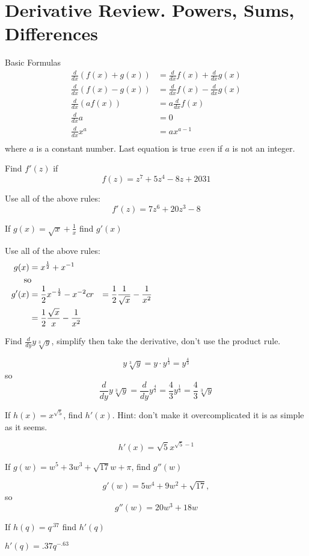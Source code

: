 \section*{Derivative Review. Powers, Sums, Differences}
\noprintanswers
Basic Formulas
\begin{equation}
  \begin{aligned}
    \frac{d}{dx} \left(f(x)+g(x)\right) &= \frac{d}{dx} f(x)+\frac{d}{dx} g(x) \\
    \frac{d}{dx} \left(f(x)-g(x)\right) &= \frac{d}{dx} f(x)-\frac{d}{dx} g(x) \\
    \frac{d}{dx} \left(af(x)\right) &= a\frac{d}{dx} f(x) \\
    \frac{d}{dx} a &= 0 \\
    \frac{d}{dx} x^a &= ax^{a-1} \\
  \end{aligned}
\end{equation}
where $a$ is a constant number. Last equation is true {\it even} if $a$ is not an integer.
  
\begin{questions}
\question
Find $f'(z)$ if
$$f(z)=z^7+5z^4-8z+2031$$
\begin{solution}[1.5in]
  Use all of the above rules:
  $$f'(z)=7z^6+20z^3-8$$
\end{solution}
\question
If $\displaystyle{g(x) = \sqrt{x}+\frac{1}{x}}$ find $g'(x)$
\begin{solution}[1.5in]
  Use all of the above rules:
  \begin{equation}
    \begin{aligned}
    g(x) &= x^{\frac{1}{2}}+ x^{-1}\cr
    \noalign{so}
    g'(x)&= \frac{1}{2}x^{-\frac{1}{2}} - x^{-2}cr
    &= \frac{1}{2}\frac{1}{\sqrt{x}} - \frac{1}{x^2}\cr
    &= \frac{1}{2}\frac{\sqrt{x}}{x} - \frac{1}{x^2}\cr
    \end{aligned}
  \end{equation}
\end{solution}
\question
Find $\displaystyle{\frac{d}{dy} y\sqrt[3]{y}}$, simplify then take the derivative, don't use the product rule.
\begin{solution}[1.5in]
  $$y\sqrt[3]{y}=y\cdot y^{\frac{1}{3}}=y^{\frac{4}{3}}$$
    so
    $$\frac{d}{dy} y\sqrt[3]{y} = \frac{d}{dy} y^{\frac{4}{3}} = \frac{4}{3}y^{\frac{1}{3}} = \frac{4}{3}\sqrt[3]{y}$$
\end{solution}
\newpage
\question
If $h(x)=x^{\sqrt{5}}$, find $h'(x)$. Hint: don't make it overcomplicated it is as simple as it seems.
\begin{solution}[1.5in]
  $$h'(x)=\sqrt{5}x^{\sqrt{5}-1}$$
\end{solution}
\question
If $g(w) = w^5+3w^3+\sqrt{17}w+\pi$, find $g''(w)$
\begin{solution}[1.5in]
  $$g'(w)=5w^4+9w^2+\sqrt{17},$$ so
  $$g''(w)=20w^3+18w$$
\end{solution}
\question
If $h(q) = q^{.37}$ find $h'(q)$
\begin{solution}[1.5in]
  $h'(q)=.37q^{-.63}$
\end{solution}
\end{questions}
